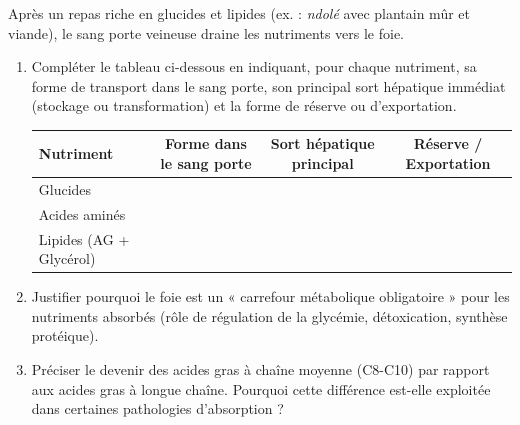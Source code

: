 \documentclass[11pt]{article}
\begin{document}
\begin{exercice}
Après un repas riche en glucides et lipides (ex. : \textit{ndolé} avec plantain mûr et viande), le sang porte veineuse draine les nutriments vers le foie.
\begin{enumerate}
    \item Compléter le tableau ci-dessous en indiquant, pour chaque nutriment, sa forme de transport dans le sang porte, son principal sort hépatique immédiat (stockage ou transformation) et la forme de réserve ou d'exportation.
    \begin{tabular}{|l|c|c|c|}
    \hline
    \textbf{Nutriment} & \textbf{Forme dans le sang porte} & \textbf{Sort hépatique principal} & \textbf{Réserve / Exportation} \\
    \hline
    Glucides & & & \\
    \hline
    Acides aminés & & & \\
    \hline
    Lipides (AG + Glycérol) & & & \\
    \hline
    \end{tabular}
    \item Justifier pourquoi le foie est un « carrefour métabolique obligatoire » pour les nutriments absorbés (rôle de régulation de la glycémie, détoxication, synthèse protéique).
    \item Préciser le devenir des acides gras à chaîne moyenne (C8-C10) par rapport aux acides gras à longue chaîne. Pourquoi cette différence est-elle exploitée dans certaines pathologies d'absorption ?
\end{enumerate}
\end{exercice}
\end{document}
